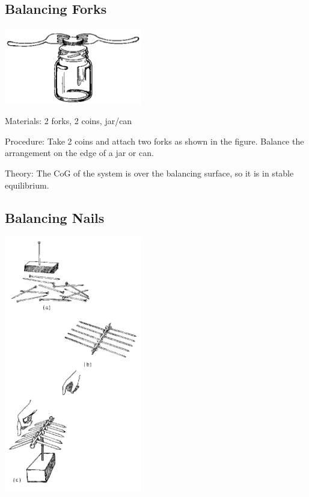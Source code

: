 \begin{multicols}{2}
\subsection{Balancing Forks}

\begin{center}
\includegraphics[width=0.45\textwidth]{./img/source/forks.png}
\end{center}

\begin{description*}
\item[Materials:]{2 forks, 2 coins, jar/can}
\item[Procedure:]{Take 2 coins and attach two forks as shown in the figure. Balance the arrangement on the edge of a jar or can.}
\item[Theory:]{The CoG of the system is over the balancing surface, so it is in stable equilibrium.}
\end{description*}

\columnbreak

\subsection{Balancing Nails}

\begin{center}
\includegraphics[width=0.45\textwidth]{./img/source/nails-1.png}
\end{center}


\end{multicols}
